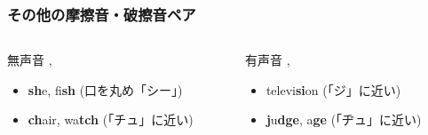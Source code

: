 \documentclass[aspectratio=169,xcolor={dvipsnames,table}]{beamer}
\begin{document}
\begin{frame}
    \frametitle{その他の摩擦音・破擦音ペア}
     \begin{columns}[T,totalwidth=\textwidth]
        \begin{column}{.45\textwidth}
            \begin{alertblock}{無声音 , }
                \begin{itemize}
                    \item[\textipa{/S/}] \textbf{sh}e, fi\textbf{sh} (口を丸め「シー」)
                    \item[\textipa{/tS/}] \textbf{ch}air, wa\textbf{tch} (「チュ」に近い)
                \end{itemize}
            \end{alertblock}
        \end{column}
        \begin{column}{.45\textwidth}
            \begin{block}{有声音 , }
                \begin{itemize}
                    \item[\textipa{/Z/}] televi\textbf{si}on (「ジ」に近い)
                    \item[\textipa{/dZ/}] \textbf{j}u\textbf{dge}, a\textbf{ge} (「ヂュ」に近い)
                \end{itemize}
            \end{block}
        \end{column}
    \end{columns}
\end{frame}
\end{document}
